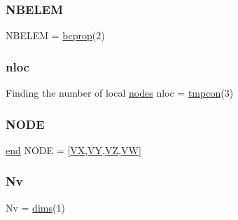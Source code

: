 \mbox{\label{a00608_a20507c612303aa48d9e49883e863fa60}} 
\subsubsection{\texorpdfstring{N\+B\+E\+L\+EM}{NBELEM}}
{\footnotesize\ttfamily N\+B\+E\+L\+EM = \hyperlink{a00608_aeb3bba3f2a1cac40e67dcec5c4faf3d8}{bcprop}(2)}

\mbox{\label{a00608_af770575536260d1af58b8fddaaefb98d}} 
\subsubsection{\texorpdfstring{nloc}{nloc}}
{\footnotesize\ttfamily Finding the number of local \hyperlink{a00608_a9fd973fb7dcbed4123ae5eb2f3868e61}{nodes} nloc = \hyperlink{a00608_ac90fbb5b14a3c144a13164ba8eff726a}{tmpcon}(3)}

\mbox{\label{a00608_a5b72722269640873d2b15c2b7fa0ae25}} 
\subsubsection{\texorpdfstring{N\+O\+DE}{NODE}}
{\footnotesize\ttfamily \hyperlink{a00608_afb358f48b1646c750fb9da6c6585be2b}{end} N\+O\+DE = \mbox{[}\hyperlink{a00608_a6339563199f1df5b474ae537cd435e9b}{VX}\textquotesingle{},\hyperlink{a00608_a2f2925c90dcdcd0458fa06a0d2fc2fc4}{VY}\textquotesingle{},\hyperlink{a00608_a19fb6d0c72728c85075e94ea04a60a66}{VZ}\textquotesingle{},\hyperlink{a00608_a279fc4bc04d1e6cb4941402ba6e29874}{VW}\textquotesingle{}\mbox{]}}

\mbox{\label{a00608_a664a2a7a8ba4f45899cfc3b5a7cbab06}} 
\subsubsection{\texorpdfstring{Nv}{Nv}}
{\footnotesize\ttfamily Nv = \hyperlink{a00608_a3c9228983ba1c014121246254d146e96}{dims}(1)}

